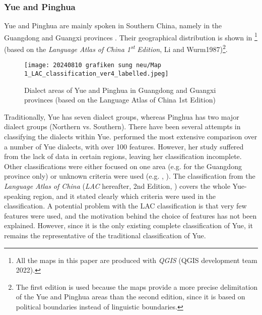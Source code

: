 \documentclass[output=paper, chinesefont]{langscibook}
\begin{document}
\subsubsection{Yue and Pinghua}
\label{sec:sung:4.1.1}
Yue and Pinghua are mainly spoken in Southern China, namely in the Guangdong and Guangxi provinces \citep{CASS2012}. Their geographical distribution is shown in \footnote{All the maps in this paper are produced with \textit{QGIS} (QGIS development team 2022).} (based on the \textit{Language Atlas of China 1\textsuperscript{st}} \textit{Edition}, Li and Wurm1987)\footnote{The first edition is used because the maps provide a more precise delimitation of the Yue and Pinghua areas than the second edition, since it is based on political boundaries instead of linguistic boundaries.}.

  
\begin{figure}[t]
\texttt{[image: 20240810 grafiken sung neu/Map 1\_LAC\_classification\_ver4\_labelled.jpeg]}
 \caption{Dialect areas of Yue and Pinghua in Guangdong and Guangxi provinces (based on the Language Atlas of China 1st Edition)}
\label{fig:sung:1}
\end{figure}

Traditionally, Yue has seven dialect groups, whereas Pinghua has two major dialect groups (Northern vs. Southern). There have been several attempts in classifying the dialects within Yue. \citet{YueHashimoto1988} performed the most extensive comparison over a number of Yue dialects, with over 100 features. However, her study suffered from the lack of data in certain regions, leaving her classification incomplete. Other classifications were either focused on one area (e.g. \citealt{Zhan2002} for the Guangdong province only) or unknown criteria were used (e.g. \citealt{Zhan1981}, \citealt{Yuan2001}). The classification from the \textit{Language Atlas of China} (\textit{LAC} hereafter, 2nd Edition, \citealt{CASS2012}) covers the whole Yue-speaking region, and it stated clearly which criteria were used in the classification. A potential problem with the LAC classification is that very few features were used, and the motivation behind the choice of features has not been explained. However, since it is the only existing complete classification of Yue, it remains the representative of the traditional classification of Yue.
\end{document}
